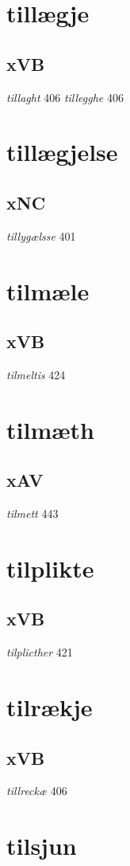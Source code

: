 \documentclass[a4paper,twocolumn]{article}
\begin{document}
\section{tillægje}
\label{sec:org5e82c2a}
\subsection{xVB}
\label{sec:orgdf280cc}
\emph{tillaght} 406 \emph{tillegghe} 406 
\section{tillægjelse}
\label{sec:org70f6115}
\subsection{xNC}
\label{sec:org6d10e43}
\emph{tillygælsse} 401 
\section{tilmæle}
\label{sec:org119be8c}
\subsection{xVB}
\label{sec:orgd45baa5}
\emph{tilmeltis} 424 
\section{tilmæth}
\label{sec:org5bab60b}
\subsection{xAV}
\label{sec:orgf5041d9}
\emph{tilmett} 443 
\section{tilplikte}
\label{sec:org4c34ec8}
\subsection{xVB}
\label{sec:org07c647b}
\emph{tilplicther} 421 
\section{tilrækje}
\label{sec:org7aaa3b1}
\subsection{xVB}
\label{sec:org6d25d2a}
\emph{tillreckæ} 406 
\section{tilsjun}
\label{sec:org7f66023}
\end{document}
